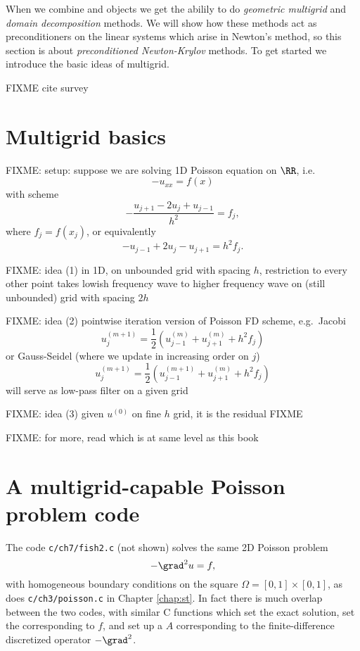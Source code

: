 
When we combine \PETSc \pDMDA and \pSNES objects we get the abilily to do \emph{geometric multigrid} \citep{Briggsetal2000,Trottenbergetal2001} and \emph{domain decomposition} \citep{Smithetal1996,Doleanetal2015} methods.  We will show how these methods act as preconditioners on the linear systems which arise in Newton's method, so this section is about \emph{preconditioned Newton-Krylov} methods.  To get started we introduce the basic ideas of multigrid.

FIXME cite survey \citep{Wathen2015}

\section{Multigrid basics}

FIXME: setup: suppose we are solving 1D Poisson equation on $\RR$, i.e.
    $$- u_{xx} = f(x)$$
with scheme
    $$- \frac{u_{j+1} - 2 u_j + u_{j-1}}{h^2} = f_j,$$
where $f_j = f(x_j)$, or equivalently
    $$- u_{j-1} + 2 u_j - u_{j+1} = h^2 f_j.$$

FIXME: idea (1) in 1D, on unbounded grid with spacing $h$, restriction to every other point takes lowish frequency wave to higher frequency wave on (still unbounded) grid with spacing $2h$

FIXME: idea (2) pointwise iteration version of Poisson FD scheme, e.g.~Jacobi
   $$u_j^{(m+1)} = \frac{1}{2} \left(u_{j-1}^{(m)} + u_{j+1}^{(m)} + h^2 f_j\right) $$
or Gauss-Seidel (where we update in increasing order on $j$)
   $$u_j^{(m+1)} = \frac{1}{2} \left(u_{j-1}^{(m+1)} + u_{j+1}^{(m)} + h^2 f_j\right) $$
will serve as low-pass filter on a given grid

FIXME: idea (3) given $u^{(0)}$ on fine $h$ grid, it is the residual FIXME

FIXME: for more, read \citep{Briggsetal2000} which is at same level as this book


\section{A multigrid-capable Poisson problem code}

The code \texttt{c/ch7/fish2.c} (not shown) solves the same 2D Poisson problem
    $$-\grad^2 u = f,$$
with homogeneous boundary conditions on the square $\Omega=[0,1]\times[0,1]$, as does \texttt{c/ch3/poisson.c} in Chapter \ref{chap:st}.  In fact there is much overlap between the two codes, with similar C functions which set the exact solution, set the \pVec corresponding to $f$, and set up a \pMat $A$ corresponding to the finite-difference discretized operator $-\grad^2$.

